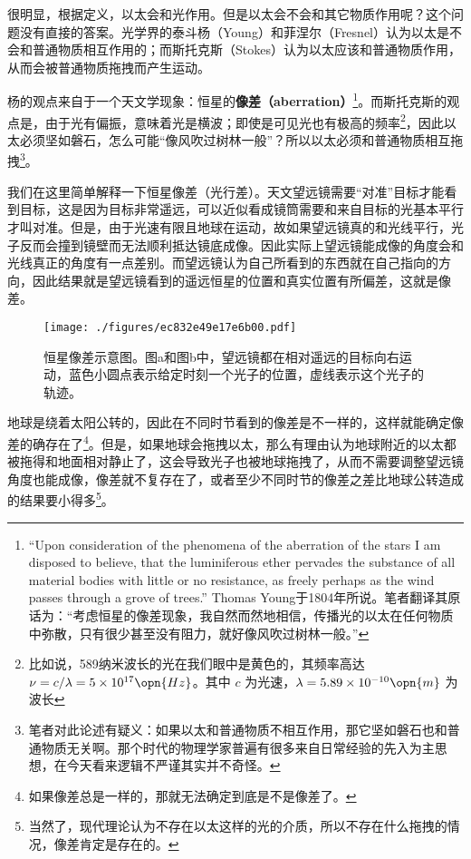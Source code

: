很明显，根据定义，以太会和光作用。但是以太会不会和其它物质作用呢？这个问题没有直接的答案。光学界的泰斗杨（Young）和菲涅尔（Fresnel）认为以太是不会和普通物质相互作用的；而斯托克斯（Stokes）认为以太应该和普通物质作用，从而会被普通物质拖拽而产生运动。

杨的观点来自于一个天文学现象：恒星的\textbf{像差（aberration）}\footnote{“Upon consideration of the phenomena
of the aberration of the stars I am disposed to believe, that the luminiferous ether pervades the substance of all material bodies with little or no resistance, as freely perhaps as the wind passes through a grove of trees.” Thomas Young于1804年所说。笔者翻译其原话为：“考虑恒星的像差现象，我自然而然地相信，传播光的以太在任何物质中弥散，只有很少甚至没有阻力，就好像风吹过树林一般。”}。而斯托克斯的观点是，由于光有偏振，意味着光是横波；即使是可见光也有极高的频率\footnote{比如说，589纳米波长的光在我们眼中是黄色的，其频率高达 $\nu=c/\lambda=5\times10^{17}\opn{Hz}$。其中 $c$ 为光速，$\lambda=5.89\times10^{-10}\opn{m}$ 为波长}，因此以太必须坚如磐石，怎么可能“像风吹过树林一般”？所以以太必须和普通物质相互拖拽\footnote{笔者对此论述有疑义：如果以太和普通物质不相互作用，那它坚如磐石也和普通物质无关啊。那个时代的物理学家普遍有很多来自日常经验的先入为主思想，在今天看来逻辑不严谨其实并不奇怪。}。%

我们在这里简单解释一下恒星像差（光行差）。天文望远镜需要“对准”目标才能看到目标，这是因为目标非常遥远，可以近似看成镜筒需要和来自目标的光基本平行才叫对准。但是，由于光速有限且地球在运动，故如果望远镜真的和光线平行，光子反而会撞到镜壁而无法顺利抵达镜底成像。因此实际上望远镜能成像的角度会和光线真正的角度有一点差别。而望远镜认为自己所看到的东西就在自己指向的方向，因此结果就是望远镜看到的遥远恒星的位置和真实位置有所偏差，这就是像差。

\begin{figure}[ht]
\centering
\texttt{[image: ./figures/ec832e49e17e6b00.pdf]}
\caption{恒星像差示意图。图a和图b中，望远镜都在相对遥远的目标向右运动，蓝色小圆点表示给定时刻一个光子的位置，虚线表示这个光子的轨迹。} \label{fig_SpeRel_1}
\end{figure}

地球是绕着太阳公转的，因此在不同时节看到的像差是不一样的，这样就能确定像差的确存在了\footnote{如果像差总是一样的，那就无法确定到底是不是像差了。}。但是，如果地球会拖拽以太，那么有理由认为地球附近的以太都被拖得和地面相对静止了，这会导致光子也被地球拖拽了，从而不需要调整望远镜角度也能成像，像差就不复存在了，或者至少不同时节的像差之差比地球公转造成的结果要小得多\footnote{当然了，现代理论认为不存在以太这样的光的介质，所以不存在什么拖拽的情况，像差肯定是存在的。}。



